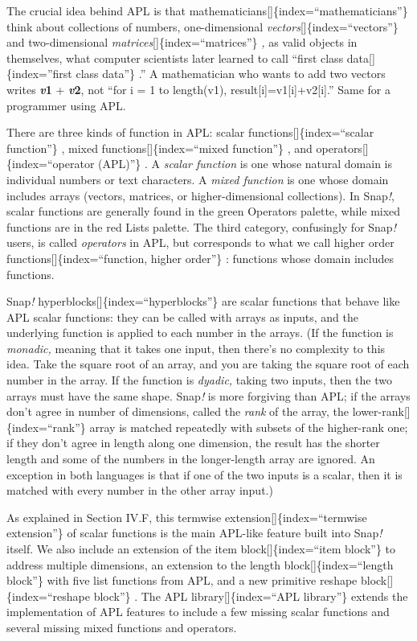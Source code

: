 \documentclass[
  letterpaper,
]{book}
\begin{document}
The crucial idea behind APL is that
mathematicians{[}{]}\{index=``mathematicians''\} think about collections
of numbers, one-dimensional \emph{vectors}{[}{]}\{index=``vectors''\}
and two-dimensional \emph{matrices}{[}{]}\{index=``matrices''\} \emph{,}
as valid objects in themselves, what computer scientists later learned
to call ``first class data{[}{]}\{index=''first class data''\} .'' A
mathematician who wants to add two vectors writes \textbf{\emph{v}1} +
\textbf{\emph{v}2}, not ``for i = 1 to length(v1),
result{[}i{]}=v1{[}i{]}+v2{[}i{]}.'' Same for a programmer using APL.

There are three kinds of function in APL: scalar
functions{[}{]}\{index=``scalar function''\} , mixed
functions{[}{]}\{index=``mixed function''\} , and
operators{[}{]}\{index=``operator (APL)''\} . A \emph{scalar function}
is one whose natural domain is individual numbers or text characters. A
\emph{mixed function} is one whose domain includes arrays (vectors,
matrices, or higher-dimensional collections). In Snap\emph{!}, scalar
functions are generally found in the green Operators palette, while
mixed functions are in the red Lists palette. The third category,
confusingly for Snap\emph{!} users, is called \emph{operators} in APL,
but corresponds to what we call higher order
functions{[}{]}\{index=``function, higher order''\} : functions whose
domain includes functions.

Snap\emph{!} hyperblocks{[}{]}\{index=``hyperblocks''\} are scalar
functions that behave like APL scalar functions: they can be called with
arrays as inputs, and the underlying function is applied to each number
in the arrays. (If the function is \emph{monadic,} meaning that it takes
one input, then there's no complexity to this idea. Take the square root
of an array, and you are taking the square root of each number in the
array. If the function is \emph{dyadic,} taking two inputs, then the two
arrays must have the same shape. Snap\emph{!} is more forgiving than
APL; if the arrays don't agree in number of dimensions, called the
\emph{rank} of the array, the lower-rank{[}{]}\{index=``rank''\} array
is matched repeatedly with subsets of the higher-rank one; if they don't
agree in length along one dimension, the result has the shorter length
and some of the numbers in the longer-length array are ignored. An
exception in both languages is that if one of the two inputs is a
scalar, then it is matched with every number in the other array input.)

As explained in Section IV.F, this termwise
extension{[}{]}\{index=``termwise extension''\} of scalar functions is
the main APL-like feature built into Snap\emph{!} itself. We also
include an extension of the item block{[}{]}\{index=``item block''\} to
address multiple dimensions, an extension to the length
block{[}{]}\{index=``length block''\} with five list functions from APL,
and a new primitive reshape block{[}{]}\{index=``reshape block''\} . The
APL library{[}{]}\{index=``APL library''\} extends the implementation of
APL features to include a few missing scalar functions and several
missing mixed functions and operators.
\end{document}
